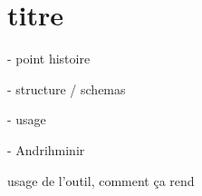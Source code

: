 \chapter{titre}
\label{chap:erysichtonUsage}


- point histoire

- structure / schemas

- usage

- Andrihminir

usage de l'outil, comment ça rend